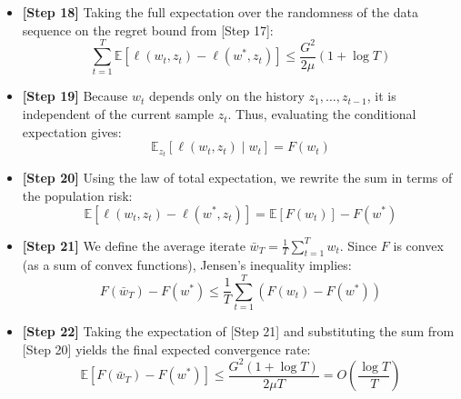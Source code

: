 \documentclass[12pt]{article}
\begin{document}
\begin{itemize}
    \item \textbf{[Step 18]} Taking the full expectation over the randomness of the data sequence on the regret bound from [Step 17]:
    $$\sum_{t=1}^T \mathbb{E}[\ell(w_t, z_t) - \ell(w^*, z_t)] \leq \frac{G^2}{2\mu}(1 + \log T)$$
    
    \item \textbf{[Step 19]} Because $w_t$ depends only on the history $z_1, \dots, z_{t-1}$, it is independent of the current sample $z_t$. Thus, evaluating the conditional expectation gives:
    $$\mathbb{E}_{z_t}[\ell(w_t, z_t) \mid w_t] = F(w_t)$$
    
    \item \textbf{[Step 20]} Using the law of total expectation, we rewrite the sum in terms of the population risk:
    $$\mathbb{E}[\ell(w_t, z_t) - \ell(w^*, z_t)] = \mathbb{E}[F(w_t)] - F(w^*)$$
    
    \item \textbf{[Step 21]} We define the average iterate $\bar{w}_T = \frac{1}{T} \sum_{t=1}^T w_t$. Since $F$ is convex (as a sum of convex functions), Jensen's inequality implies:
    $$F(\bar{w}_T) - F(w^*) \leq \frac{1}{T} \sum_{t=1}^T (F(w_t) - F(w^*))$$
    
    \item \textbf{[Step 22]} Taking the expectation of [Step 21] and substituting the sum from [Step 20] yields the final expected convergence rate:
    $$\mathbb{E}[F(\bar{w}_T) - F(w^*)] \leq \frac{G^2 (1 + \log T)}{2\mu T} = O\left(\frac{\log T}{T}\right)$$
\end{itemize}
\end{document}
